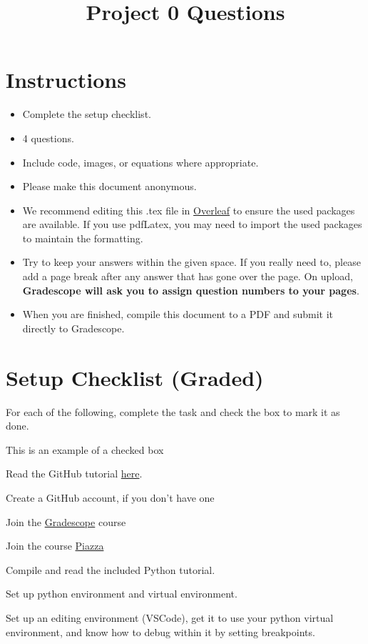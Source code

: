 \documentclass[11pt]{article}
\date{}
\title{\vspace{-1cm}Project 0 Questions}
\newcommand{\cmark}{\ding{51}}%
\newcommand{\done}{\rlap{$\square$}{\raisebox{2pt}{\large\hspace{1pt}\cmark}}%
\hspace{-2.5pt}}
\begin{document}
\maketitle
\vspace{-2cm}
\thispagestyle{fancy}

\section*{Instructions}
\begin{itemize}
  \item Complete the setup checklist.
  \item 4 questions.
  \item Include code, images, or equations where appropriate.
  \item Please make this document anonymous.
  \item We recommend editing this .tex file in \href{https://www.overleaf.com/}{Overleaf} to ensure the used packages are available. If you use pdfLatex, you may need to import the used packages to maintain the formatting. 
  \item Try to keep your answers within the given space. If you really need to, please add a page break after any answer that has gone over the page. On upload, \textbf{Gradescope will ask you to assign question numbers to your pages}.
  \item When you are finished, compile this document to a PDF and submit it directly to Gradescope.
    
\end{itemize}

\section*{Setup Checklist (Graded)}

For each of the following, complete the task and check the box to mark it as done.
\begin{todolist}
    \item[\done] This is an example of a checked box
    \item Read the GitHub tutorial \href{https://docs.google.com/document/d/1Hli-42Tv91tnghbxW4Pn44aGGeV9MMb4NgIktg9jN-U/edit?usp=sharing}{here}.
    \item Create a GitHub account, if you don't have one
    \item Join the \href{https://www.gradescope.com/}{Gradescope} course
    \item Join the course \href{https://piazza.com/}{Piazza} 
    \item Compile and read the included Python tutorial.
    \item Set up python environment and virtual environment.
    \item Set up an editing environment (VSCode), get it to use your python virtual environment, and know how to debug within it by setting breakpoints.
\end{todolist}
\end{document}
